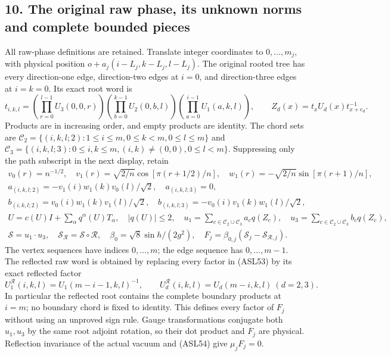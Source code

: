 \documentclass[11pt]{article}
\begin{document}
\subsection*{10. The original raw phase, its unknown norms and complete bounded pieces}

All raw-phase definitions are retained. Translate integer coordinates to \(0,\ldots,m_j\), with physical position \(o+a_j(i-L_j,k-L_j,l-L_j)\). The original rooted tree has every direction-one edge, direction-two edges at \(i=0\), and direction-three edges at \(i=k=0\). Its exact root word is
\[
 t_{i,k,l}=\left(\prod_{r=0}^{l-1}U_3(0,0,r)\right)
          \left(\prod_{b=0}^{k-1}U_2(0,b,l)\right)
          \left(\prod_{a=0}^{i-1}U_1(a,k,l)\right),\qquad
 Z_d(x)=t_xU_d(x)t_{x+e_d}^{-1}.
 \tag{ASL53}
\]
Products are in increasing order, and empty products are identity. The chord sets are \(\mathcal C_2=\{(i,k,l;2):1\le i\le m,0\le k<m,0\le l\le m\}\) and \(\mathcal C_3=\{(i,k,l;3):0\le i,k\le m,(i,k)\ne(0,0),0\le l<m\}\). Suppressing only the path subscript in the next display, retain
\[
\begin{gathered}
 v_0(r)=n^{-1/2},\quad v_1(r)=\sqrt{2/n}\cos[\pi(r+1/2)/n],\quad
 w_1(r)=-\sqrt{2/n}\sin[\pi(r+1)/n],\\
 a_{(i,k,l;2)}=-v_1(i)w_1(k)v_0(l)/\sqrt2,\quad a_{(i,k,l;3)}=0,\\
 b_{(i,k,l;2)}=v_0(i)w_1(k)v_1(l)/\sqrt2,\quad
 b_{(i,k,l;3)}=-v_0(i)v_1(k)w_1(l)/\sqrt2,\\
 U=c(U)I+\sum_\alpha q^\alpha(U)T_\alpha,\quad |q(U)|\le2,\quad
 u_1=\sum_{c\in\mathcal C_2\cup\mathcal C_3}a_cq(Z_c),\quad
 u_3=\sum_{c\in\mathcal C_2\cup\mathcal C_3}b_cq(Z_c),\\
 \mathcal S=u_1\cdot u_3,\quad
 \mathcal S_{\mathcal R}=\mathcal S\circ\mathcal R,\quad
 \beta_0=\sqrt8\sin h/(2g^2),\quad
 F_j=\beta_{0,j}(\mathcal S_j-\mathcal S_{\mathcal R,j}).
\end{gathered}\tag{ASL54}
\]
The vertex sequences have indices \(0,\ldots,m\); the edge sequence has \(0,\ldots,m-1\). The reflected raw word is obtained by replacing every factor in (ASL53) by its exact reflected factor
\[
 U_1^{\mathcal R}(i,k,l)=U_1(m-i-1,k,l)^{-1},\qquad
 U_d^{\mathcal R}(i,k,l)=U_d(m-i,k,l)\ (d=2,3).
 \tag{ASL55}
\]
In particular the reflected root contains the complete boundary products at \(i=m\); no boundary chord is fixed to identity. This defines every factor of \(F_j\) without using an unproved sign rule. Gauge transformations conjugate both \(u_1,u_3\) by the same root adjoint rotation, so their dot product and \(F_j\) are physical. Reflection invariance of the actual vacuum and (ASL54) give \(\mu_jF_j=0\).
\end{document}
